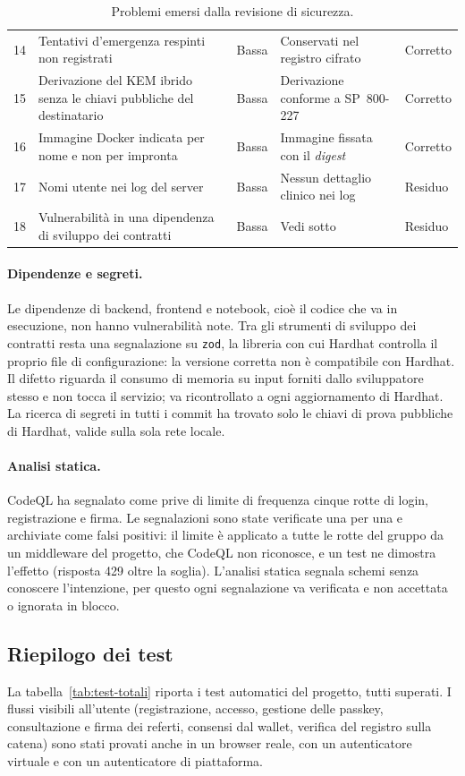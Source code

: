 \begin{table}[H]
\begin{tabular}{@{}p{}p{}p{}p{}p{}@{}}
14 & Tentativi d'emergenza respinti non registrati & Bassa & Conservati nel registro cifrato & Corretto\\
15 & Derivazione del KEM ibrido senza le chiavi pubbliche del destinatario & Bassa & Derivazione conforme a SP~800-227 & Corretto\\
16 & Immagine Docker indicata per nome e non per impronta & Bassa & Immagine fissata con il \emph{digest} & Corretto\\
17 & Nomi utente nei log del server & Bassa & Nessun dettaglio clinico nei log & Residuo\\
18 & Vulnerabilità in una dipendenza di sviluppo dei contratti & Bassa & Vedi sotto & Residuo\\
\bottomrule
\end{tabular}
\caption{Problemi emersi dalla revisione di sicurezza.}\label{tab:revisione}
\end{table}

\paragraph{Dipendenze e segreti.} Le dipendenze di backend, frontend e notebook, cioè il codice che va in esecuzione, non hanno vulnerabilità note. Tra gli strumenti di sviluppo dei contratti resta una segnalazione su \texttt{zod}, la libreria con cui Hardhat controlla il proprio file di configurazione: la versione corretta non è compatibile con Hardhat. Il difetto riguarda il consumo di memoria su input forniti dallo sviluppatore stesso e non tocca il servizio; va ricontrollato a ogni aggiornamento di Hardhat. La ricerca di segreti in tutti i commit ha trovato solo le chiavi di prova pubbliche di Hardhat, valide sulla sola rete locale.

\paragraph{Analisi statica.} CodeQL ha segnalato come prive di limite di frequenza cinque rotte di login, registrazione e firma. Le segnalazioni sono state verificate una per una e archiviate come falsi positivi: il limite è applicato a tutte le rotte del gruppo da un middleware del progetto, che CodeQL non riconosce, e un test ne dimostra l'effetto (risposta 429 oltre la soglia). L'analisi statica segnala schemi senza conoscere l'intenzione, per questo ogni segnalazione va verificata e non accettata o ignorata in blocco.

\subsection{Riepilogo dei test}
La tabella~\ref{tab:test-totali} riporta i test automatici del progetto, tutti superati. I flussi visibili all'utente (registrazione, accesso, gestione delle passkey, consultazione e firma dei referti, consensi dal wallet, verifica del registro sulla catena) sono stati provati anche in un browser reale, con un autenticatore virtuale e con un autenticatore di piattaforma.


